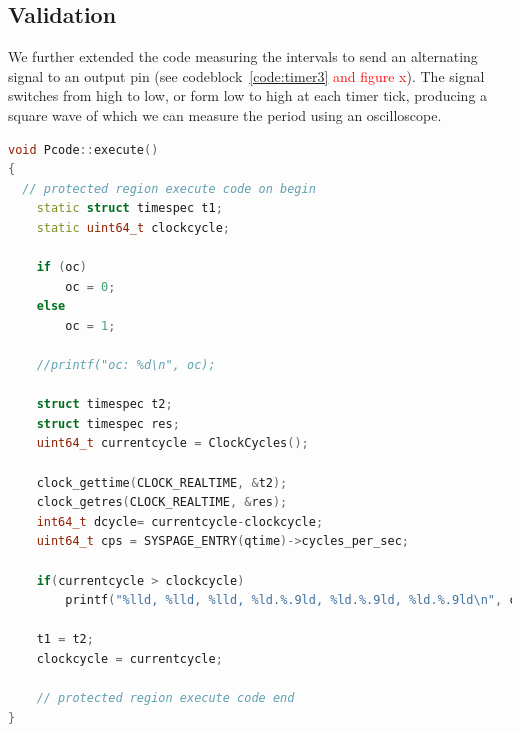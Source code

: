 \documentclass[a4paper,twoside,11pt]{article}
\newcommand{\todo}[1]{{\Large\sc\textcolor{red}{#1}}}
\begin{document}
\FloatBarrier
\subsection{Validation}
We further extended the code measuring the intervals to send an alternating signal to an output pin (see codeblock~\ref{code:timer3} \todo{and figure x}). The signal switches from high to low, or form low to high at each timer tick, producing a square wave of which we can measure the period using an oscilloscope.

\begin{lstlisting}[caption=Pcode::execute (extended), label=code:timer3, language=C++]
void Pcode::execute()
{
  // protected region execute code on begin
	static struct timespec t1;
	static uint64_t clockcycle;

	if (oc)
		oc = 0;
	else
		oc = 1;

	//printf("oc: %d\n", oc);

	struct timespec t2;
	struct timespec res;
	uint64_t currentcycle = ClockCycles();

	clock_gettime(CLOCK_REALTIME, &t2);
	clock_getres(CLOCK_REALTIME, &res);
	int64_t dcycle= currentcycle-clockcycle;
	uint64_t cps = SYSPAGE_ENTRY(qtime)->cycles_per_sec;

	if(currentcycle > clockcycle)
		printf("%lld, %lld, %lld, %ld.%.9ld, %ld.%.9ld, %ld.%.9ld\n", currentcycle, clockcycle, cps, res.tv_sec, res.tv_nsec, t2.tv_sec, t2.tv_nsec, t1.tv_sec, t1.tv_nsec);

	t1 = t2;
	clockcycle = currentcycle;

	// protected region execute code end
}
\end{lstlisting}
\end{document}
